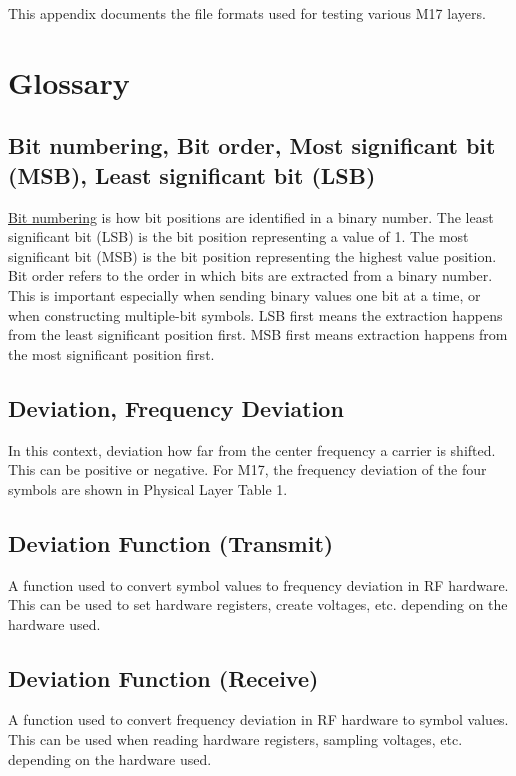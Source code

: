 \documentclass[a4paper,11pt]{book}
\begin{document}
This appendix documents the file formats used for testing various M17
layers.

\section{Glossary}

\subsection{Bit numbering, Bit order, Most significant bit (MSB), Least significant bit (LSB)}

\href{https://en.wikipedia.org/wiki/Bit_numbering}{Bit numbering} is how bit positions are identified in a binary number. The least significant bit (LSB) is the bit position representing a value of 1. The most significant bit (MSB) is the bit position representing the highest value position. Bit order refers to the order in which bits are extracted from a binary number. This is important especially when sending binary values one bit at a time, or when constructing multiple-bit symbols. LSB first means the extraction happens from the least significant position first. MSB first means extraction happens from the most significant position first.

\subsection{Deviation, Frequency Deviation}

In this context, deviation how far from the center frequency a carrier is shifted. This can be positive or negative. For M17, the frequency deviation of the four symbols are shown in Physical Layer Table 1.

\subsection{Deviation Function (Transmit)}

A function used to convert symbol values to frequency deviation in RF hardware. This can be used to set hardware registers, create voltages, etc. depending on the hardware used.

\subsection{Deviation Function (Receive)}

A function used to convert frequency deviation in RF hardware to symbol values. This can be used when reading hardware registers, sampling voltages, etc. depending on the hardware used.
\end{document}
